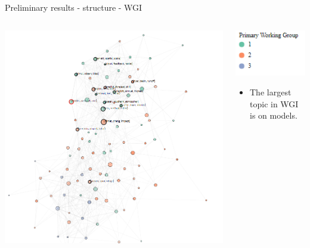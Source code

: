 \documentclass[9pt]{beamer}
\begin{document}
\begin{frame}{Preliminary results - structure - WGI}

\begin{columns}
	\begin{column}{0.65\linewidth}
		\begin{center}
			\vspace*{-0.1\linewidth}
			\includegraphics[width=1.1\linewidth]{../plots/network_wg_372_1.PNG}
		\end{center}
	\end{column}
	\begin{column}{0.35\linewidth}
		\includegraphics[width=0.4\linewidth]{../plots/network_wg_key.PNG}
		\begin{center}
			\begin{itemize}
				\item The largest topic in WGI is on models.
			\end{itemize}
		\end{center}
	\end{column}
\end{columns}

\end{frame}
\end{document}
